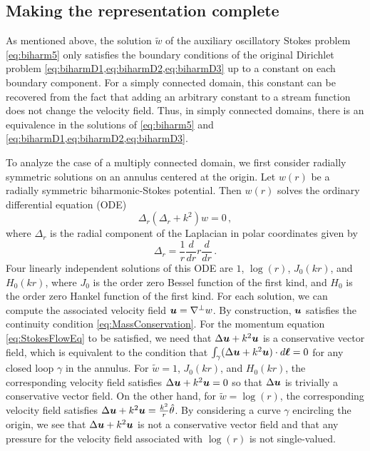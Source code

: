 \subsection{Making the representation complete}
As mentioned above, the solution $\tilde{w}$ of 
the auxiliary oscillatory Stokes problem \cref{eq:biharm5}
only satisfies the boundary conditions of the 
original Dirichlet problem \cref{eq:biharmD1,eq:biharmD2,eq:biharmD3}
up to a constant on each boundary component. For a simply
connected domain, this constant can be recovered from the
fact that adding an arbitrary constant to a stream function
does not change the velocity field. 
Thus, in simply connected domains, there is an equivalence in the 
solutions of \cref{eq:biharm5} and \cref{eq:biharmD1,eq:biharmD2,eq:biharmD3}.

To analyze the case of a multiply connected domain,
we first consider
radially symmetric solutions on an annulus centered at the
origin. Let $w\left(r\right)$ be a 
radially symmetric biharmonic-Stokes
potential. Then $w(r)$ solves the ordinary differential
equation (ODE)
\begin{equation}
\Delta_{r} (\Delta_{r} + k^2)w = 0 \, ,
\end{equation}
where $\Delta_{r}$ is the radial component of the Laplacian in polar
coordinates given by
$$
\Delta_{r} = \frac{1}{r}\frac{d}{dr} r \frac{d}{dr} \, .
$$
Four linearly independent solutions of this ODE are $1$, $\log{(r)}$, 
$J_{0}(kr)$, and $H_{0}(kr)$, 
where $J_{0}$ is the order zero Bessel function of the first kind, and $H_{0}$ is the order zero Hankel function of the first kind.
For each solution, we can compute the associated velocity field 
${\boldsymbol u} = \nabla^{\perp} w$. By construction, ${\boldsymbol u}$ satisfies 
the continuity condition \cref{eq:MassConservation}. 
For the momentum equation \cref{eq:StokesFlowEq} to be 
satisfied, we need that $\Delta{\boldsymbol u} + k^2 {\boldsymbol u}$ is a conservative
vector field, which 
is equivalent to the condition that 
$\int_{\gamma} (\Delta{\boldsymbol u} + k^2 {\boldsymbol u}) \cdot d{\boldsymbol \ell} = 0$ 
for any closed 
loop $\gamma$ in the annulus. For $\tilde{w}=1$, $J_{0}(kr)$, and $H_{0}(kr)$,
the corresponding velocity field satisfies
$\Delta {\boldsymbol u} + k^2 {\boldsymbol u}=0$ so that $\Delta {\boldsymbol u}$
is trivially a conservative vector field. 
On the other hand, for $\tilde{w}=\log{(r)}$, the corresponding velocity field
satisfies $\Delta {\boldsymbol u} + k^2 {\boldsymbol u}=\frac{k^2}{r} \hat{\theta}$.
By considering a curve $\gamma$ encircling the origin,
we see that $\Delta {\boldsymbol u} + k^2 {\boldsymbol u}$ is not a conservative vector
field and that any pressure for the velocity field 
associated with $\log\left(r\right)$ is not single-valued.
